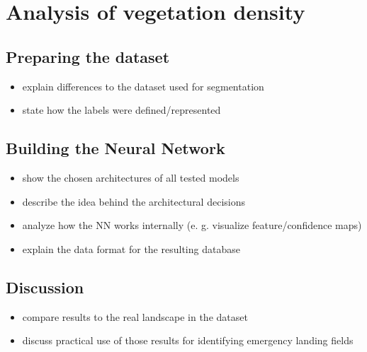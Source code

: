 \section{Analysis of vegetation density}

\subsection{Preparing the dataset}
\begin{itemize}
    \item explain differences to the dataset used for segmentation
    \item state how the labels were defined/represented
\end{itemize}

\subsection{Building the Neural Network}
\begin{itemize}
    \item show the chosen architectures of all tested models
    \item describe the idea behind the architectural decisions
    \item analyze how the NN works internally (e. g. visualize feature/confidence maps)
    \item explain the data format for the resulting database
\end{itemize}

\subsection{Discussion}
\begin{itemize}
    \item compare results to the real landscape in the dataset
    \item discuss practical use of those results for identifying emergency landing fields
\end{itemize}

\newpage
